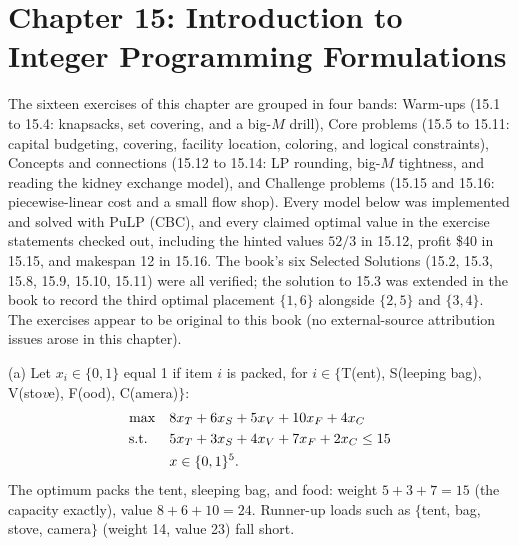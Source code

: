 
\section{Chapter 15: Introduction to Integer Programming Formulations}

The sixteen exercises of this chapter are grouped in four bands: Warm-ups (15.1 to 15.4: knapsacks, set covering, and a big-$M$ drill), Core problems (15.5 to 15.11: capital budgeting, covering, facility location, coloring, and logical constraints), Concepts and connections (15.12 to 15.14: LP rounding, big-$M$ tightness, and reading the kidney exchange model), and Challenge problems (15.15 and 15.16: piecewise-linear cost and a small flow shop). Every model below was implemented and solved with PuLP (CBC), and every claimed optimal value in the exercise statements checked out, including the hinted values $52/3$ in 15.12, profit \$40 in 15.15, and makespan 12 in 15.16. The book's six Selected Solutions (15.2, 15.3, 15.8, 15.9, 15.10, 15.11) were all verified; the solution to 15.3 was extended in the book to record the third optimal placement $\{1,6\}$ alongside $\{2,5\}$ and $\{3,4\}$. The exercises appear to be original to this book (no external-source attribution issues arose in this chapter).


(a) Let $x_i \in \{0,1\}$ equal 1 if item $i$ is packed, for $i \in \{$T(ent), S(leeping bag), V(sto\emph{v}e), F(ood), C(amera)$\}$:
\[
\begin{aligned}
\max\quad & 8x_T + 6x_S + 5x_V + 10x_F + 4x_C\\
\text{s.t.}\;\;\quad & 5x_T + 3x_S + 4x_V + 7x_F + 2x_C \leq 15\\
& x \in \{0,1\}^5.
\end{aligned}
\]
The optimum packs the tent, sleeping bag, and food: weight $5+3+7 = 15$ (the capacity exactly), value $8+6+10 = 24$. Runner-up loads such as $\{$tent, bag, stove, camera$\}$ (weight 14, value 23) fall short.

